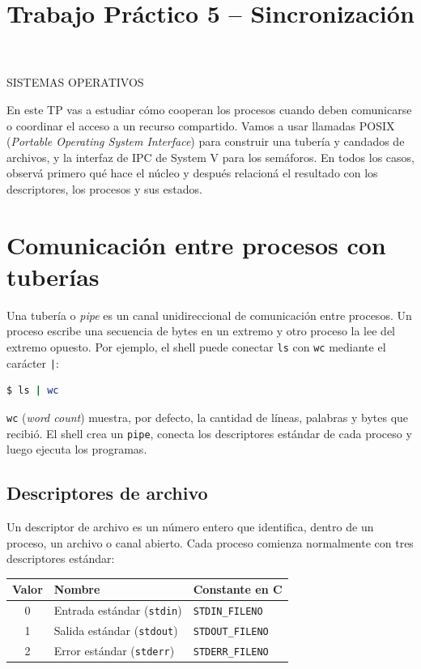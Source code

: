 \documentclass[11pt,a4paper]{article}
\title{Trabajo Práctico 5 -- Sincronización}
\author{}
\date{}
\begin{document}
\maketitle
\thispagestyle{fancy}
\begin{center}
SISTEMAS OPERATIVOS
\end{center}
\newpage

\tableofcontents
\newpage

En este TP vas a estudiar cómo cooperan los procesos cuando deben
comunicarse o coordinar el acceso a un recurso compartido. Vamos a usar
llamadas POSIX (\emph{Portable Operating System Interface}) para construir una
tubería y candados de archivos, y la interfaz de IPC de System V para los
semáforos. En todos los casos, observá primero qué hace el núcleo y después
relacioná el resultado con los descriptores, los procesos y sus estados.

\section{Comunicación entre procesos con tuberías}

Una tubería o \emph{pipe} es un canal unidireccional de comunicación entre
procesos. Un proceso escribe una secuencia de bytes en un extremo y otro
proceso la lee del extremo opuesto. Por ejemplo, el shell puede conectar
\texttt{ls} con \texttt{wc} mediante el carácter \texttt{|}:

\begin{lstlisting}[language=bash]
$ ls | wc
\end{lstlisting}

\texttt{wc} (\emph{word count}) muestra, por defecto, la cantidad de líneas,
palabras y bytes que recibió. El shell crea un \texttt{pipe}, conecta los
descriptores estándar de cada proceso y luego ejecuta los programas.

\subsection{Descriptores de archivo}

Un descriptor de archivo es un número entero que identifica, dentro de un
proceso, un archivo o canal abierto. Cada proceso comienza normalmente con
tres descriptores estándar:

\begin{center}
\begin{tabular}{c|l|l}
\textbf{Valor} & \textbf{Nombre} & \textbf{Constante en C} \\
\hline
0 & Entrada estándar (\texttt{stdin}) & \texttt{STDIN\_FILENO} \\
1 & Salida estándar (\texttt{stdout}) & \texttt{STDOUT\_FILENO} \\
2 & Error estándar (\texttt{stderr}) & \texttt{STDERR\_FILENO}
\end{tabular}
\end{center}
\end{document}
